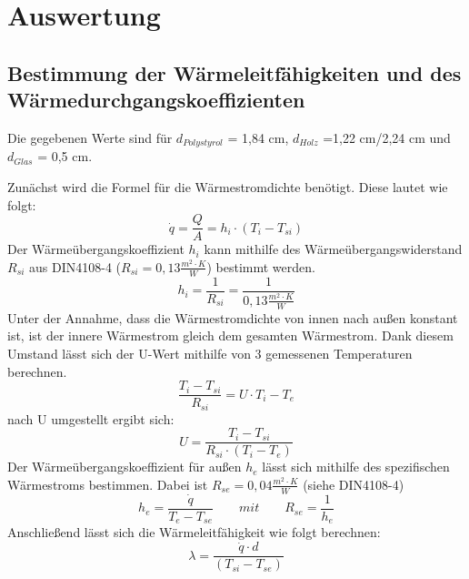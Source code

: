\section{Auswertung}
\subsection{Bestimmung der Wärmeleitfähigkeiten und des Wärmedurchgangskoeffizienten}
Die gegebenen Werte sind für $d_{Polystyrol}$ = 1,84 cm, $d_{Holz}$ =1,22 cm/2,24 cm und $d_{Glas}$ = 0,5 cm.

Zunächst wird die Formel für die Wärmestromdichte benötigt. Diese lautet wie folgt:
\begin{equation}
\dot q=\frac{ Q }{ A }=h_{ i }\cdot(T_{ i }-T_{si})
  \label{eq:230514_Wärmestromdichte}
\end{equation}
Der Wärmeübergangskoeffizient $h_{i}$ kann mithilfe des Wärmeübergangswiderstand $R_{si}$ aus DIN4108-4 ($R_{si}=0,13 \frac{m^2 \cdot K}{W} $) bestimmt werden.
\begin{equation}
h_{i}=\frac{ 1 }{ R_{ si } }=\frac{ 1 }{ 0,13 \frac{m^2\cdot K}{ W }}
  \label{eq:230514_Wärmeübergangskoeffizient}
\end{equation}
Unter der Annahme, dass die Wärmestromdichte von innen nach außen konstant ist, ist der innere Wärmestrom gleich dem gesamten Wärmestrom. Dank diesem Umstand lässt sich der U-Wert mithilfe von 3 gemessenen Temperaturen berechnen.
\begin{equation}
\frac{ T_{i} - T_{si}}{ R_{ si } }=U \cdot T_{i} - T_{e}
  \label{eq:230514_u1}
\end{equation}
nach U umgestellt ergibt sich: 
\begin{equation}
U = \frac{ T_{i} - T_{si}}{ R_{ si } \cdot  (T_{i} - T_{e})}
  \label{eq:230514_u2}
\end{equation}
Der Wärmeübergangskoeffizient für außen $h_{e}$ lässt sich mithilfe des spezifischen Wärmestroms bestimmen.
Dabei ist $R_{se}=0,04 \frac{ m^2 \cdot K }{W}$ (siehe DIN4108-4)
\begin{equation}
h_{e}=\frac{ \dot q }{ T_{e} - T_{se} }   \qquad  mit     \qquad       R_{se}=\frac{ 1 }{ h_{e} }
  \label{eq:230514_h_e}
\end{equation}
Anschließend lässt sich die Wärmeleitfähigkeit wie folgt berechnen:
\begin{equation}
\lambda=\frac{ \dot q \cdot d }{  ( T_{si} - T_{se} )}
  \label{eq:230514_lamda}
\end{equation}


